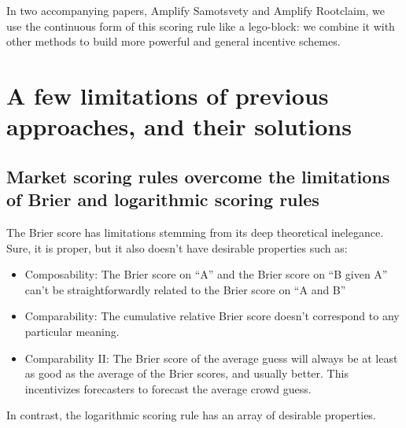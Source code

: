 \documentclass[]{article}
\providecommand{\tightlist}{%
  \setlength{\itemsep}{0pt}\setlength{\parskip}{0pt}}
\begin{document}
In two accompanying papers, Amplify Samotsvety and Amplify Rootclaim, we
use the continuous form of this scoring rule like a lego-block: we
combine it with other methods to build more powerful and general
incentive schemes.

\hypertarget{a-few-limitations-of-previous-approaches-and-their-solutions}{%
\section{A few limitations of previous approaches, and their
solutions}\label{a-few-limitations-of-previous-approaches-and-their-solutions}}

\hypertarget{market-scoring-rules-overcome-the-limitations-of-brier-and-logarithmic-scoring-rules}{%
\subsection{Market scoring rules overcome the limitations of Brier and
logarithmic scoring
rules}\label{market-scoring-rules-overcome-the-limitations-of-brier-and-logarithmic-scoring-rules}}

The Brier score has limitations stemming from its deep theoretical
inelegance. Sure, it is proper, but it also doesn't have desirable
properties such as:

\begin{itemize}
\tightlist
\item
  Composability: The Brier score on ``A'' and the Brier score on ``B
  given A'' can't be straightforwardly related to the Brier score on ``A
  and B''
\item
  Comparability: The cumulative relative Brier score doesn't correspond
  to any particular meaning.
\item
  Comparability II: The Brier score of the average guess will always be
  at least as good as the average of the Brier scores, and usually
  better. This incentivizes forecasters to forecast the average crowd
  guess.
\end{itemize}

In contrast, the logarithmic scoring rule has an array of desirable
properties.
\end{document}
